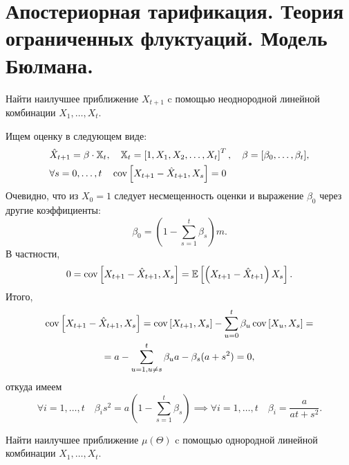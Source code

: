 \chapter{Апостериорная тарификация. Теория ограниченных флуктуаций. Модель Бюлмана.}

    \problem{}
    Найти наилучшее приближение $X_{t+1}$ c помощью неоднородной линейной комбинации $X_1,\dots, X_t$. 
    
    \solution{}
        Ищем оценку в следующем виде:
        \begin{align}
            & \hat X_{t+1} = \beta \cdot \mathbb{X}_t, \quad \mathbb{X}_t = \left[1, X_1, X_2, \dots, X_t\right]^T, \quad \beta = [\beta_0, \dots, \beta_t], \\
            & \forall s = 0, \dots, t \quad \operatorname*{cov}\left[X_{t+1} - \hat X_{t+1}, X_s\right] = 0
        \end{align}
        Очевидно, что из $X_0 = 1$ следует несмещенность оценки и выражение $\beta_0$ через другие коэффициенты:
        \begin{equation}
            \beta_0 = \left(1 - \sum_{s = 1}^t \beta_s\right)m.
        \end{equation}
        В частности, \begin{equation}
            0 = \operatorname*{cov}\left[X_{t+1} - \hat X_{t+1}, X_s\right] = \mathbb{E}\left[\left(X_{t+1} - \hat X_{t+1}\right) X_s\right].
        \end{equation}
        Итого, 
        \begin{multline}
            \operatorname*{cov}\left[X_{t+1} - \hat X_{t+1}, X_s\right] = \operatorname*{cov}\left[X_{t+1}, X_s\right] - \sum_{u = 0}^t\beta_u\operatorname*{cov}\left[X_{u}, X_s\right] =\\=
            a - \sum_{u = 1, u \neq s}^t\beta_ua - \beta_s(a+s^2) = 0,
        \end{multline}
        откуда имеем
        \begin{equation}
            \forall i = 1, \dots, t\quad  \beta_is^2 = a\left(1 - \sum_{s = 1}^t \beta_s\right) \implies \forall i = 1, \dots, t\quad  \beta_i = \frac{a}{at + s^2}.
        \end{equation}

    \problem{}
    Найти наилучшее приближение $\mu(\Theta)$ c помощью однородной линейной комбинации $X_1,\dots,X_t$. 
    

